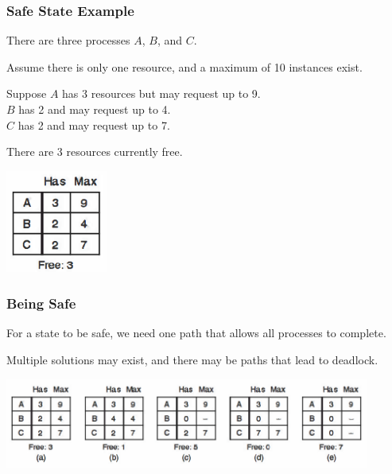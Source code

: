 \begin{frame}
	\frametitle{Safe State Example}

	There are three processes $A$, $B$, and $C$.

	Assume there is only one resource, and a maximum of 10 instances exist.

	Suppose $A$ has 3 resources but may request up to 9.\\
	$B$ has 2 and may request up to 4.\\
	$C$ has 2 and may request up to 7.

	There are 3 resources currently free.

	\begin{center}
		\includegraphics[width=0.25\textwidth]{images/safe-state-initial.png}
	\end{center}

\end{frame}

\begin{frame}
	\frametitle{Being Safe}


	For a state to be safe, we need one path that allows all processes to complete.

	Multiple solutions may exist, and there may be paths that lead to deadlock.

	\begin{center}
		\includegraphics[width=0.9\textwidth]{images/safe-state.png}
	\end{center}


\end{frame}

